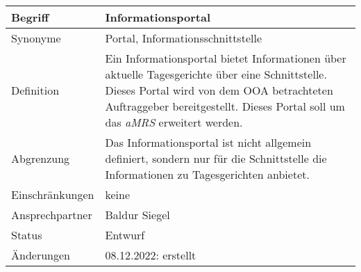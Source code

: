 \begin{table}[H]
    \centering
    \label{gls:informationsportal}
    \begin{tabularx}{\textwidth}{| l | X |}
        \hline
        Begriff         & Informationsportal                                                                                                                                                                                                                  \\
        \hline
        Synonyme        & Portal, Informationsschnittstelle                                                                                                                                                                                                   \\
        \hline
        Definition      & Ein Informationsportal bietet Informationen über aktuelle Tagesgerichte über eine Schnittstelle. Dieses Portal wird von dem OOA betrachteten Auftraggeber bereitgestellt. Dieses Portal soll um das \textit{aMRS} erweitert werden. \\
        \hline
        Abgrenzung      & Das Informationsportal ist nicht allgemein definiert, sondern nur für die Schnittstelle die Informationen zu Tagesgerichten anbietet.                                                                                               \\
        \hline
        Einschränkungen & keine                                                                                                                                                                                                                               \\
        \hline
        Ansprechpartner & Baldur Siegel                                                                                                                                                                                                                       \\
        \hline
        Status          & Entwurf                                                                                                                                                                                                                             \\
        \hline
        Änderungen      & 08.12.2022: erstellt                                                                                                                                                                                                                \\
        \hline
    \end{tabularx}
\end{table}




